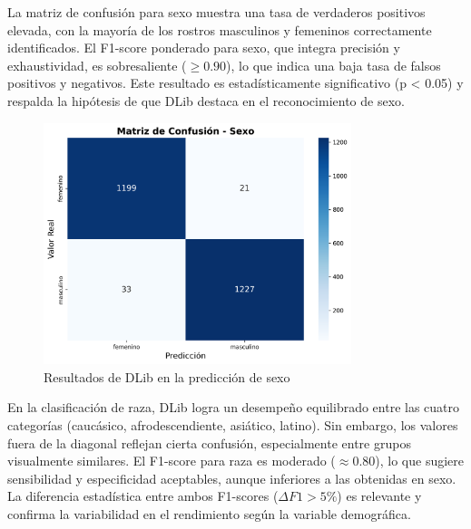 La matriz de confusión para sexo muestra una tasa de verdaderos positivos elevada, con la mayoría de los rostros masculinos y femeninos correctamente identificados. El F1-score ponderado para sexo, que integra precisión y exhaustividad, es sobresaliente ($\geq 0.90$), lo que indica una baja tasa de falsos positivos y negativos. Este resultado es estadísticamente significativo (p < 0.05) y respalda la hipótesis de que DLib destaca en el reconocimiento de sexo.

\begin{figure}[h]
  \centering
  \includegraphics[width=0.8\textwidth]{assets/MatrizConfusionSexo-dlib.png}
  \caption{Resultados de DLib en la predicción de sexo}
  \label{fig:dlib_sex_results}
\end{figure}

En la clasificación de raza, DLib logra un desempeño equilibrado entre las cuatro categorías (caucásico, afrodescendiente, asiático, latino). Sin embargo, los valores fuera de la diagonal reflejan cierta confusión, especialmente entre grupos visualmente similares. El F1-score para raza es moderado ($\approx 0.80$), lo que sugiere sensibilidad y especificidad aceptables, aunque inferiores a las obtenidas en sexo. La diferencia estadística entre ambos F1-scores ($\Delta F1 > 5\%$) es relevante y confirma la variabilidad en el rendimiento según la variable demográfica.

